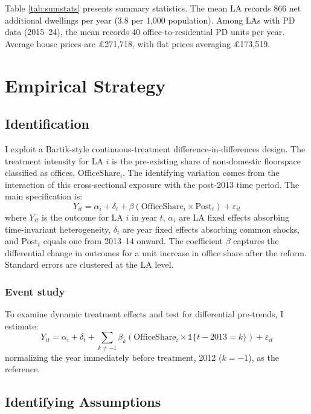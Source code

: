 \documentclass[12pt]{article}
\begin{document}


Table \ref{tab:sumstats} presents summary statistics. The mean LA records 866 net additional dwellings per year (3.8 per 1,000 population). Among LAs with PD data (2015--24), the mean records 40 office-to-residential PD units per year. Average house prices are \pounds271,718, with flat prices averaging \pounds173,519.


\section{Empirical Strategy}

\subsection{Identification}

I exploit a Bartik-style continuous-treatment difference-in-differences design. The treatment intensity for LA $i$ is the pre-existing share of non-domestic floorspace classified as offices, $\text{OfficeShare}_i$. The identifying variation comes from the interaction of this cross-sectional exposure with the post-2013 time period. The main specification is:
\begin{equation}
Y_{it} = \alpha_i + \delta_t + \beta (\text{OfficeShare}_i \times \text{Post}_t) + \varepsilon_{it}
\label{eq:main}
\end{equation}
where $Y_{it}$ is the outcome for LA $i$ in year $t$, $\alpha_i$ are LA fixed effects absorbing time-invariant heterogeneity, $\delta_t$ are year fixed effects absorbing common shocks, and $\text{Post}_t$ equals one from 2013--14 onward. The coefficient $\beta$ captures the differential change in outcomes for a unit increase in office share after the reform. Standard errors are clustered at the LA level.

\subsubsection*{Event study} To examine dynamic treatment effects and test for differential pre-trends, I estimate:
\begin{equation}
Y_{it} = \alpha_i + \delta_t + \sum_{k \neq -1} \beta_k (\text{OfficeShare}_i \times \mathbb{1}\{t - 2013 = k\}) + \varepsilon_{it}
\label{eq:es}
\end{equation}
normalizing the year immediately before treatment, 2012 ($k = -1$), as the reference.

\subsection{Identifying Assumptions}
\end{document}
